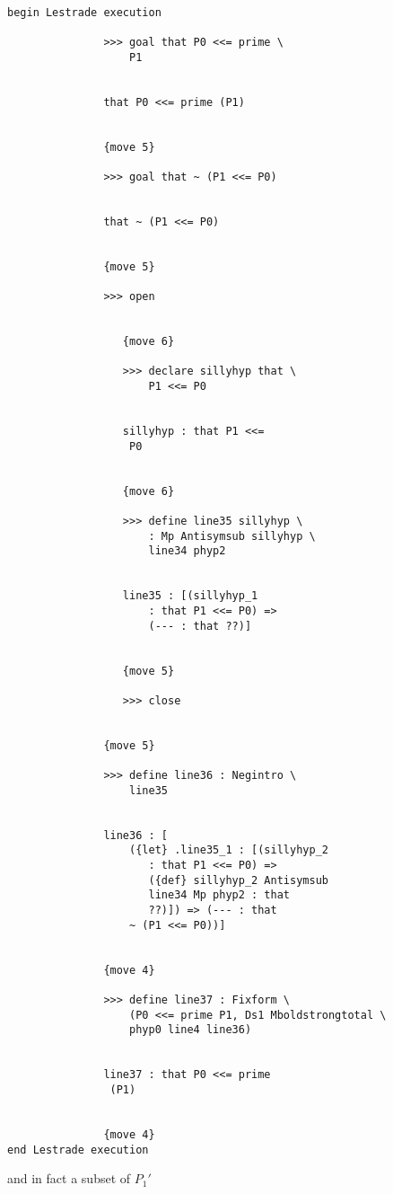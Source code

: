 \documentclass[12pt]{article}
\begin{document}
\begin{verbatim}

begin Lestrade execution

               >>> goal that P0 <<= prime \
                   P1


               that P0 <<= prime (P1)


               {move 5}

               >>> goal that ~ (P1 <<= P0)


               that ~ (P1 <<= P0)


               {move 5}

               >>> open


                  {move 6}

                  >>> declare sillyhyp that \
                      P1 <<= P0


                  sillyhyp : that P1 <<= 
                   P0


                  {move 6}

                  >>> define line35 sillyhyp \
                      : Mp Antisymsub sillyhyp \
                      line34 phyp2


                  line35 : [(sillyhyp_1 
                      : that P1 <<= P0) => 
                      (--- : that ??)]


                  {move 5}

                  >>> close


               {move 5}

               >>> define line36 : Negintro \
                   line35


               line36 : [
                   ({let} .line35_1 : [(sillyhyp_2 
                      : that P1 <<= P0) => 
                      ({def} sillyhyp_2 Antisymsub 
                      line34 Mp phyp2 : that 
                      ??)]) => (--- : that 
                   ~ (P1 <<= P0))]


               {move 4}

               >>> define line37 : Fixform \
                   (P0 <<= prime P1, Ds1 Mboldstrongtotal \
                   phyp0 line4 line36)


               line37 : that P0 <<= prime 
                (P1)


               {move 4}
end Lestrade execution
\end{verbatim}

and in fact a subset of $P_1'$
\end{document}
